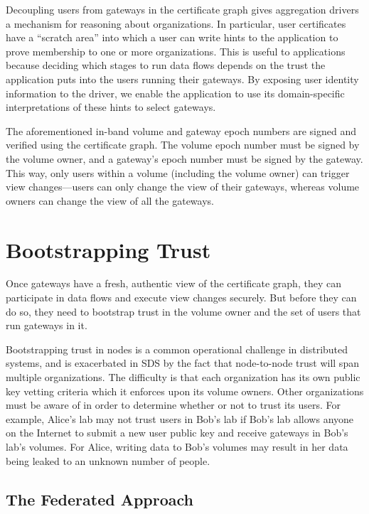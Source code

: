 Decoupling users from gateways in the certificate graph gives aggregation
drivers a mechanism for reasoning about organizations.  In particular, user
certificates have a ``scratch area'' into which a user can write hints to the
application to prove membership to one or more organizations.  This is useful
to applications because deciding which
stages to run data flows depends on the trust the application
puts into the users running their gateways.  By exposing user identity
information to the driver, we enable the application to use its domain-specific
interpretations of these hints to select gateways.

The aforementioned in-band volume and gateway epoch numbers are signed and
verified using the certificate graph.  The volume epoch number must be signed by
the volume owner, and a gateway's epoch number must be signed by the gateway.
This way, only users within a volume (including the volume owner) can trigger
view changes---users can only change the view of their gateways, whereas volume
owners can change the view of all the gateways.

\section{Bootstrapping Trust}
\label{sec:bootstrapping-trust}

Once gateways have a fresh, authentic view of the certificate graph, they can
participate in data flows and execute view changes securely.  But before they
can do so, they need to bootstrap trust in the volume owner and the set of users
that run gateways in it.

Bootstrapping trust in nodes is a common operational challenge in
distributed systems, and is exacerbated in SDS by the fact that node-to-node
trust will span multiple organizations.
The difficulty is that each organization has its own public
key vetting criteria which it enforces upon its volume owners.
Other organizations must be aware of in order to determine
whether or not to trust its users.  For example, Alice's lab may
not trust users in Bob's lab if Bob's lab allows anyone on the Internet
to submit a new user public key and receive gateways in Bob's
lab's volumes.  For Alice, writing data to Bob's volumes may result in her data
being leaked to an unknown number of people.

\subsection{The Federated Approach}


